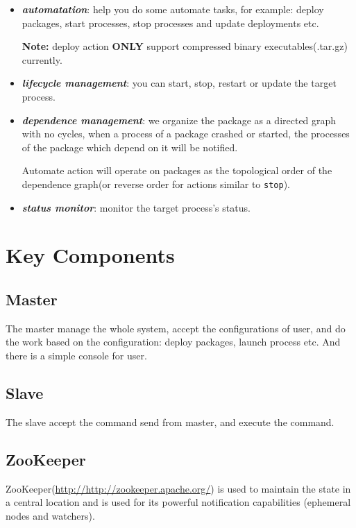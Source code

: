 \documentclass[]{article}
\newcommand{\program}[1]{\textsf{#1}}
\newcommand{\command}[1]{\texttt{#1}}
\begin{document}
\begin{itemize}
\item \textbf{\emph{automatation}}: help you do some automate tasks, for example: deploy packages, start processes, stop processes and update deployments etc.

\textbf{Note: } deploy action \textbf{ONLY} support compressed binary executables(.tar.gz) currently.
\item \textbf{\emph{lifecycle management}}: you can start, stop, restart or update the target process.

\item \textbf{\emph{dependence management}}: we organize the package as a directed graph with no cycles, when a process of a package crashed or started, the processes of the package which depend on it will be notified.

Automate action will operate on packages as the topological order of the dependence graph(or reverse order for actions similar to \command{stop}).

\item \textbf{\emph{status monitor}}: monitor the target process's status.
\end{itemize}

\section{Key Components}

\subsection{Master}

The master manage the whole system, accept the configurations of user, and do the work based on the configuration: deploy packages, launch process etc. And there is a simple console for user.

\subsection{Slave}

The slave accept the command send from master, and execute the command.

\subsection{ZooKeeper}

\program{ZooKeeper}(\url{http://http://zookeeper.apache.org/}) is used to maintain the state in a central location and is used for its powerful notification capabilities (ephemeral nodes and watchers).
\end{document}
